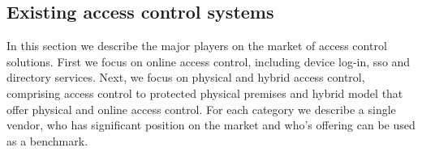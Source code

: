 \subsection{Existing access control systems} \label{competitors_sota}

In this section we describe the major players on the market of access control solutions. First we focus on online access control, including device log-in, \acrshort{sso} and directory services. Next, we focus on physical and hybrid access control, comprising access control to protected physical premises and hybrid model that offer physical and online access control. For each category we describe a single vendor, who has significant position on the market and who's offering can be used as a benchmark.


